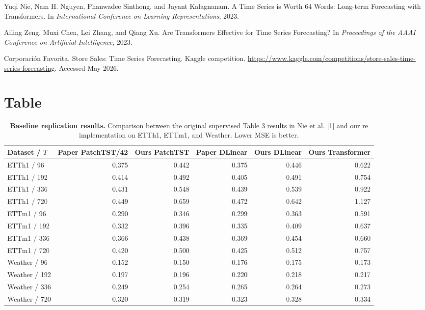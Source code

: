 \documentclass[11pt]{article}
\begin{document}
\clearpage
\begin{thebibliography}{99}
\small

Yuqi Nie, Nam H. Nguyen, Phanwadee Sinthong, and Jayant Kalagnanam.
\newblock A Time Series is Worth 64 Words: Long-term Forecasting with Transformers.
\newblock In \emph{International Conference on Learning Representations}, 2023.

Ailing Zeng, Muxi Chen, Lei Zhang, and Qiang Xu.
\newblock Are Transformers Effective for Time Series Forecasting?
\newblock In \emph{Proceedings of the AAAI Conference on Artificial Intelligence}, 2023.

Corporaci\'on Favorita.
\newblock Store Sales: Time Series Forecasting.
\newblock Kaggle competition. \url{https://www.kaggle.com/competitions/store-sales-time-series-forecasting}. Accessed May 2026.

\end{thebibliography}

\section*{Table}

\begin{table}[h]
\centering
\small
\begin{tabular}{lrrrrr}
\toprule
Dataset / $T$ & Paper PatchTST/42 & Ours PatchTST & Paper DLinear & Ours DLinear & Ours Transformer \\
\midrule
ETTh1 / 96  & 0.375 & 0.442 & 0.375 & 0.446 & 0.622 \\
ETTh1 / 192 & 0.414 & 0.492 & 0.405 & 0.491 & 0.754 \\
ETTh1 / 336 & 0.431 & 0.548 & 0.439 & 0.539 & 0.922 \\
ETTh1 / 720 & 0.449 & 0.659 & 0.472 & 0.642 & 1.127 \\
ETTm1 / 96  & 0.290 & 0.346 & 0.299 & 0.363 & 0.591 \\
ETTm1 / 192 & 0.332 & 0.396 & 0.335 & 0.409 & 0.637 \\
ETTm1 / 336 & 0.366 & 0.438 & 0.369 & 0.454 & 0.660 \\
ETTm1 / 720 & 0.420 & 0.500 & 0.425 & 0.512 & 0.757 \\
Weather / 96  & 0.152 & 0.150 & 0.176 & 0.175 & 0.173 \\
Weather / 192 & 0.197 & 0.196 & 0.220 & 0.218 & 0.217 \\
Weather / 336 & 0.249 & 0.254 & 0.265 & 0.264 & 0.273 \\
Weather / 720 & 0.320 & 0.319 & 0.323 & 0.328 & 0.334 \\
\bottomrule
\end{tabular}
\caption{\textbf{Baseline replication results.} Comparison between the original supervised Table 3 results in Nie et al. [1] and our re implementation on ETTh1, ETTm1, and Weather. Lower MSE is better.}
\label{tab:benchmark}
\end{table}
\end{document}
